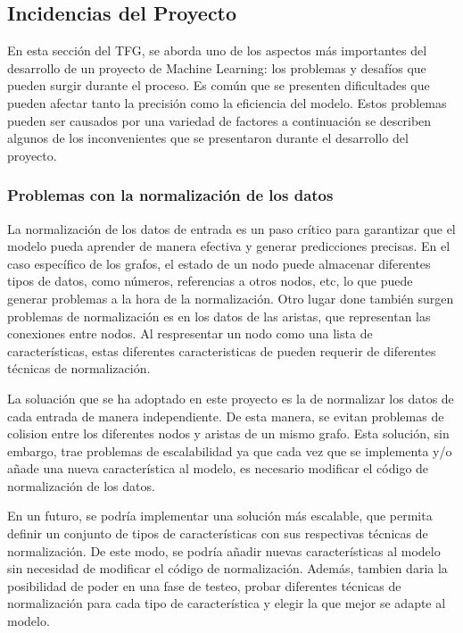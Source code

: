 \subsection{Incidencias del Proyecto}
En esta sección del TFG, se aborda uno de los aspectos más importantes del desarrollo 
de un proyecto de Machine Learning: los problemas y desafíos que pueden surgir durante 
el proceso. Es común que se presenten dificultades que pueden afectar tanto la precisión 
como la eficiencia del modelo. Estos problemas pueden ser causados por una variedad 
de factores a continuación se describen algunos de los inconvenientes que se presentaron
durante el desarrollo del proyecto.

\subsubsection{Problemas con la normalización de los datos}
La normalización de los datos de entrada es un paso crítico para garantizar que el 
modelo pueda aprender de manera efectiva y generar predicciones precisas. En el caso 
específico de los grafos, el estado de un nodo puede almacenar diferentes tipos de datos, 
como números, referencias a otros nodos, etc, lo que puede generar problemas a la hora 
de la normalización. Otro lugar done también surgen problemas de normalización es en los 
datos de las aristas, que representan las conexiones entre nodos. Al respresentar un 
nodo como una lista de características, estas diferentes caracteristicas de pueden 
requerir de diferentes técnicas de normalización.\medskip

La soluación que se ha adoptado en este proyecto es la de normalizar los datos de
cada entrada de manera independiente. De esta manera, se evitan problemas de colision 
entre los diferentes nodos y aristas de un mismo grafo. Esta solución, sin embargo,
trae problemas de escalabilidad ya que cada vez que se implementa y/o añade una nueva
característica al modelo, es necesario modificar el código de normalización de los datos.\medskip

En un futuro, se podría implementar una solución más escalable, que permita definir
un conjunto de tipos de características con sus respectivas técnicas de normalización.
De este modo, se podría añadir nuevas características al modelo sin necesidad de
modificar el código de normalización. Además, tambien daria la posibilidad de
poder en una fase de testeo, probar diferentes técnicas de normalización para
cada tipo de característica y elegir la que mejor se adapte al modelo.

